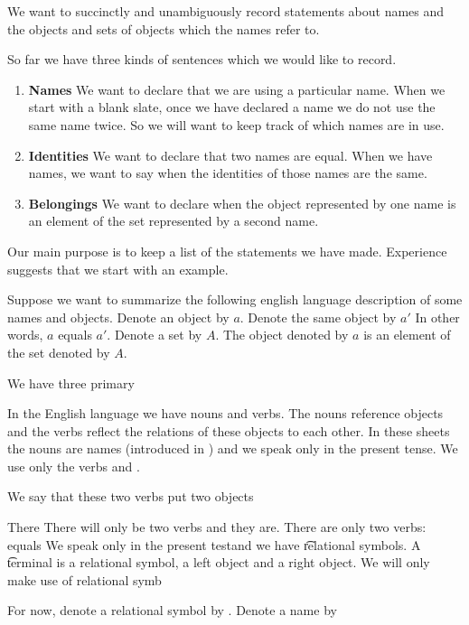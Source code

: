

We want to succinctly and unambiguously record statements about names and the objects and sets of objects which the names refer to.


So far we have three kinds of sentences which we would like to record.

\begin{enumerate}

  \item
  \textbf{Names}
  We want to declare that we are using a particular name.
  When we start with a blank slate, once we have declared a name we do not use the same name twice.
  So we will want to keep track of which names are in use.

  \item
  \textbf{Identities}
  We want to declare that two names are equal.
  When we have names, we want to say when the identities of those names are the same.

  \item
  \textbf{Belongings}
  We want to declare when the object represented by one name is an element of the set represented by a second name.

\end{enumerate}

Our main purpose is to keep a list of the statements we have made.
Experience suggests that we start with an example.

Suppose we want to summarize the following english language description of some names and objects.
Denote an object by $a$.
Denote the same object by $a'$
In other words, $a$ equals $a'$.
Denote a set by $A$.
The object denoted by $a$ is an element of the set denoted by $A$.

\begin{account}[Example]
\end{account}

We have three primary

In the English language we have nouns and verbs.
The nouns reference objects and the verbs reflect the relations of these objects to each other.
In these sheets the nouns are names (introduced in ) and we speak only in the present tense.
We use only the verbs  and .

We say that these two verbs put two objects

There
There will only be two verbs and they are.
There are only two verbs: equals
We speak only in the present testand we have \t{relational symbols}.
A \t{terminal} is a relational symbol, a left object and a right object.
We will only make use of relational symb

For now, denote a relational symbol by .
Denote a name by 
